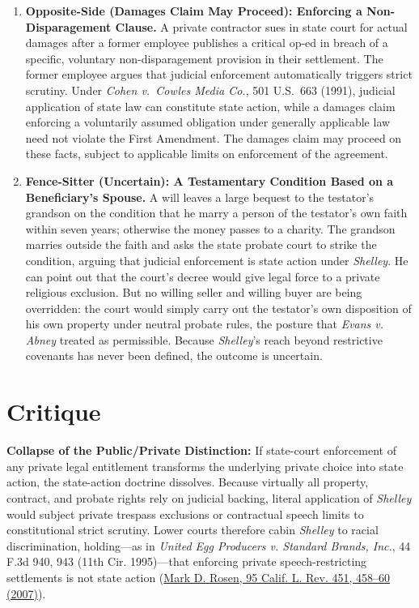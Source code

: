 \documentclass[12pt]{article}
\begin{document}
\begin{enumerate}
\item \textbf{Opposite-Side (Damages Claim May Proceed): Enforcing a Non-Disparagement Clause.} A private contractor sues in state court for actual damages after a former employee publishes a critical op-ed in breach of a specific, voluntary non-disparagement provision in their settlement. The former employee argues that judicial enforcement automatically triggers strict scrutiny. Under \textit{Cohen v.\ Cowles Media Co.}, 501 U.S.\ 663 (1991), judicial application of state law can constitute state action, while a damages claim enforcing a voluntarily assumed obligation under generally applicable law need not violate the First Amendment. The damages claim may proceed on these facts, subject to applicable limits on enforcement of the agreement.

\item \textbf{Fence-Sitter (Uncertain): A Testamentary Condition Based on a Beneficiary's Spouse.} A will leaves a large bequest to the testator's grandson on the condition that he marry a person of the testator's own faith within seven years; otherwise the money passes to a charity. The grandson marries outside the faith and asks the state probate court to strike the condition, arguing that judicial enforcement is state action under \textit{Shelley}. He can point out that the court's decree would give legal force to a private religious exclusion. But no willing seller and willing buyer are being overridden: the court would simply carry out the testator's own disposition of his own property under neutral probate rules, the posture that \textit{Evans v. Abney} treated as permissible. Because \textit{Shelley}'s reach beyond restrictive covenants has never been defined, the outcome is uncertain.

\end{enumerate}

\section{Critique}
\textbf{Collapse of the Public/Private Distinction:} If state-court enforcement of any private legal entitlement transforms the underlying private choice into state action, the state-action doctrine dissolves. Because virtually all property, contract, and probate rights rely on judicial backing, literal application of \textit{Shelley} would subject private trespass exclusions or contractual speech limits to constitutional strict scrutiny. Lower courts therefore cabin \textit{Shelley} to racial discrimination, holding---as in \textit{United Egg Producers v. Standard Brands, Inc.}, 44 F.3d 940, 943 (11th Cir. 1995)---that enforcing private speech-restricting settlements is not state action (\href{https://lawcat.berkeley.edu/record/1121131/files/fulltext.pdf}{Mark D. Rosen, 95 Calif. L. Rev. 451, 458--60 (2007)}).
\end{document}
